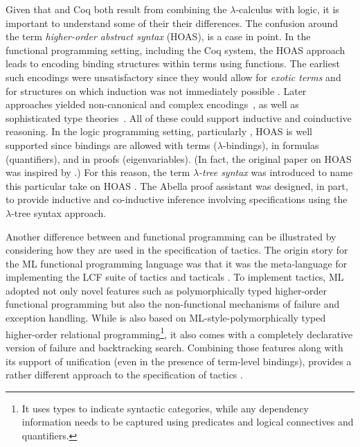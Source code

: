 Given that \lP and Coq both result from combining the
$\lambda$-calculus with logic, it is important to understand some of
their their differences.  The confusion around the term
\emph{higher-order abstract syntax} (HOAS), is a case in point.  In
the functional programming setting, including the Coq system, the HOAS
approach leads to encoding binding structures within terms using
functions.  The earliest such encodings were unsatisfactory since they
would allow for \emph{exotic terms} \cite{despeyroux95tlca} and for
structures on which induction was not immediately possible \cite{roeckl01fossacs}.
Later approaches yielded non-canonical and complex encodings~\cite{chlipala08icfp,honsell01tcs}, as well as sophisticated type theories~\cite{pientka10ijcar}. All of
these could support inductive and coinductive reasoning. 
In the logic programming setting, particularly \lP, HOAS is well
supported since bindings are allowed with terms ($\lambda$-bindings),
in formulas (quantifiers), and in proofs (eigenvariables).  (In fact,
the original paper on HOAS \cite{pfenning88pldi} was inspired by \lP.)
For this reason, the term \emph{$\lambda$-tree syntax} was introduced
to name this particular take on HOAS \cite{miller19jar}.  The Abella
proof assistant \cite{baelde14jfr} was designed, in part, to provide
inductive and co-inductive inference involving specifications using
the $\lambda$-tree syntax approach.

Another difference between \lP and functional programming can be
illustrated by considering how they are used in the specification of
tactics.  The origin story for the ML functional programming language
was that it was the meta-language for implementing the LCF suite of
tactics and tacticals \cite{gordon79}.  To implement tactics, ML
adopted not only novel features such as polymorphically typed
higher-order functional programming but also the non-functional
mechanisms of failure and exception handling.  While \lP is also based
on ML-style-polymorphically typed higher-order relational
programming\footnote{It uses types to indicate syntactic categories, while
  any dependency information needs to be captured using predicates and
  logical connectives and quantifiers.}, it also comes with a
completely declarative version of failure and backtracking search.
Combining those features along with its support of unification (even
in the presence of term-level bindings), \lP provides a rather
different approach to the specification of tactics \cite{felty93jar}.




